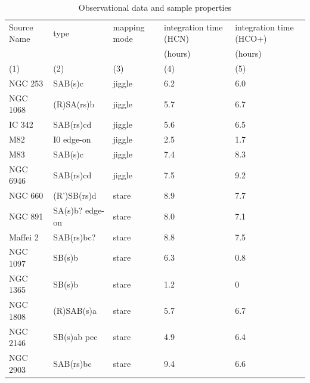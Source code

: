 \documentclass[legal,11pt]{article}
\begin{document}
\begin{table}
\caption{Observational data and sample properties}
\label{tbl:obs}
\centering
\begin{tabular}{l l l l l }
\hline
Source Name        & type                   &    mapping mode  & integration time (HCN)  &  integration time (HCO+)  \\
                   &                        &                  &(hours)                  & (hours) \\
 (1)               &       (2)              &       (3)        &       (4)               &       (5)\\
\hline
     NGC 253       &      SAB(s)c           &  jiggle          &     6.2                 & 6.0   \\
     NGC 1068      &      (R)SA(rs)b        &  jiggle          &     5.7                 & 6.7   \\
     IC 342        &      SAB(rs)cd         &  jiggle          &     5.6                 & 6.5   \\
      M82          &      I0 edge-on        &  jiggle          &     2.5                 & 1.7   \\
      M83          &      SAB(s)c           &  jiggle          &     7.4                 & 8.3   \\
     NGC 6946      &      SAB(rs)cd         &  jiggle          &     7.5                 & 9.2   \\
     NGC 660       &      (R')SB(rs)d       &  stare           &     8.9                 & 7.7   \\
     NGC 891       &      SA(s)b? edge-on   &  stare           &     8.0                 & 7.1   \\
    Maffei 2       &      SAB(rs)bc?        &  stare           &     8.8                 & 7.5   \\
    NGC 1097       &      SB(s)b            &  stare           &     6.3                 & 0.8   \\
   NGC 1365        &      SB(s)b            &  stare           &     1.2                 & 0     \\
    NGC 1808       &      (R)SAB(s)a        &  stare           &     5.7                 & 6.7   \\
     NGC 2146      &      SB(s)ab pec       &  stare           &     4.9                 & 6.4   \\
     NGC 2903      &      SAB(rs)bc         &  stare           &     9.4                 & 6.6   \\

\end{tabular}
\end{table}
\end{document}
